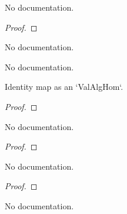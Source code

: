 \begin{theorem}\label{comp_valAlgebraMap}
        \leanok
                No documentation.
    \end{theorem}

\begin{proof}
    \leanok
\end{proof}

\begin{definition}\label{ValAlgEquiv.mk'}
                No documentation.
    \end{definition}

\begin{theorem}\label{ValAlgEquiv.coe_mk'}
                No documentation.
    \end{theorem}

\begin{theorem}\label{ValAlgHom.coe_id}
        \leanok
                Identity map as an `ValAlgHom`.
    \end{theorem}

\begin{proof}
    \leanok
\end{proof}

\begin{theorem}\label{ValAlgHom.id_toValRingHom}
        \leanok
                No documentation.
    \end{theorem}

\begin{proof}
    \leanok
\end{proof}

\begin{theorem}\label{ValAlgHom.coe_comp}
        \leanok
                No documentation.
    \end{theorem}

\begin{proof}
    \leanok
\end{proof}

\begin{theorem}\label{ValAlgHom.comp_apply}
        \leanok
                No documentation.
    \end{theorem}

